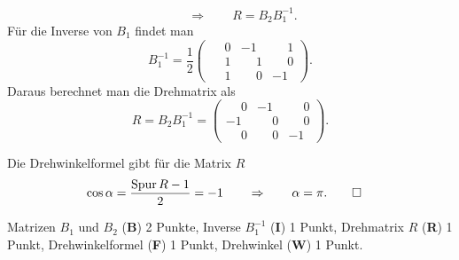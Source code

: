 \begin{loesung}
\begin{teilaufgaben}
\[\qquad \Rightarrow\qquad
R=B_2B_1^{-1}.
\]
Für die Inverse von $B_1$ findet man
%
%
%
\[
B_1^{-1}
=
\frac12
\begin{pmatrix}
\phantom{-}0&         - 1&\phantom{-}1\\
\phantom{-}1&\phantom{-}1&\phantom{-}0\\
\phantom{-}1&\phantom{-}0&         - 1
\end{pmatrix}.
\]
Daraus berechnet man die Drehmatrix als
\[
R=B_2B_1^{-1}
=
\begin{pmatrix}
\phantom{-}0&         - 1&\phantom{-}0\\
         - 1&\phantom{-}0&\phantom{-}0\\
\phantom{-}0&\phantom{-}0&         - 1
\end{pmatrix}.
\]
\item
Die Drehwinkelformel gibt für die Matrix $R$
\begin{align*}
\cos \alpha 
&=
\frac{\operatorname{Spur}R-1}2=-1
\qquad\Rightarrow\qquad\alpha=\pi.
\qedhere
\end{align*}
\end{teilaufgaben}
\end{loesung}

\begin{bewertung}
Matrizen $B_1$ und $B_2$ ({\bf B}) 2 Punkte,
Inverse $B_1^{-1}$ ({\bf I}) 1 Punkt,
Drehmatrix $R$ ({\bf R}) 1 Punkt,
Drehwinkelformel ({\bf F}) 1 Punkt,
Drehwinkel ({\bf W}) 1 Punkt.
\end{bewertung}



